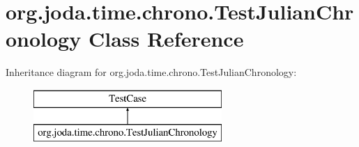 \hypertarget{classorg_1_1joda_1_1time_1_1chrono_1_1_test_julian_chronology}{\section{org.\-joda.\-time.\-chrono.\-Test\-Julian\-Chronology Class Reference}
\label{classorg_1_1joda_1_1time_1_1chrono_1_1_test_julian_chronology}
}
Inheritance diagram for org.\-joda.\-time.\-chrono.\-Test\-Julian\-Chronology\-:\begin{figure}[H]
\begin{center}
\leavevmode
\includegraphics[height=2.000000cm]{classorg_1_1joda_1_1time_1_1chrono_1_1_test_julian_chronology}
\end{center}
\end{figure}
